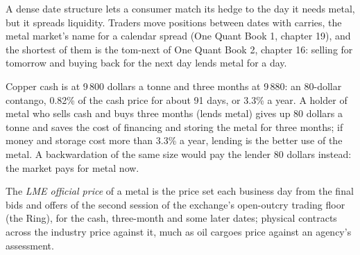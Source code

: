\begin{omfigure}

\label{fig:m3:metals:prompts}
\end{omfigure}

A dense date structure lets a consumer match its hedge to the day it needs metal, but it
spreads liquidity. Traders move positions between dates with carries, the metal market's
name for a calendar spread (One Quant Book 1, chapter 19), and the shortest of them is the
tom-next of One Quant Book 2, chapter 16: selling for tomorrow and buying back for the next
day lends metal for a day.

\begin{example}\label{ex:m3:metals:carry}
Copper cash is at 9\,800 dollars a tonne and three months at 9\,880: an 80-dollar contango, 0.82\% of
the cash price for about 91 days, or 3.3\% a year. A holder of metal who sells cash and buys three
months (lends metal) gives up 80 dollars a tonne and saves the cost of financing and storing the
metal for three months; if money and storage cost more than 3.3\% a year, lending is the better
use of the metal. A backwardation of the same size would pay the lender 80 dollars instead: the
market pays for metal now.
\end{example}

\begin{definition}\label{def:m3:metals:official}
The \emph{LME official price} of a metal is the price set each
business day from the final bids and offers of the second session of the exchange's
open-outcry trading floor (the Ring), for the cash, three-month and some later dates; physical contracts across the industry price against
it, much as oil cargoes price against an agency's assessment.
\end{definition}

